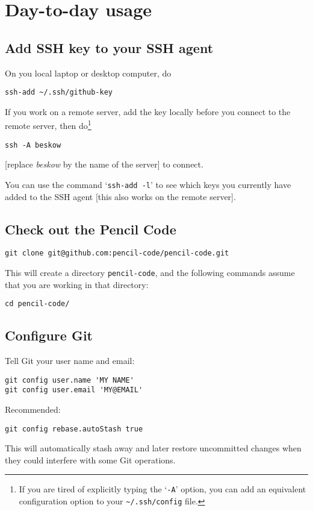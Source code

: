 \documentclass[12pt,pdftex]{article}
\begin{document}
\section{Day-to-day usage}

\subsection{Add SSH key to your SSH agent}

On you local laptop or desktop computer, do
\begin{lstlisting}
ssh-add ~/.ssh/github-key
\end{lstlisting}

If you work on a remote server, add the key locally before you connect
to the remote server, then do\footnote{
  If you are tired of explicitly typing the ‘\texttt{-A}’ option, you can
  add an equivalent configuration option to your
  \texttt{\textasciitilde{}/.ssh/config} file.%
}
\begin{lstlisting}
ssh -A beskow
\end{lstlisting}
[replace \emph{beskow} by the name of the server] to connect.

You can use the command ‘\texttt{ssh-add -l}’ to see which keys you
currently have added to the SSH agent [this also works on the remote
server].


\subsection{Check out the Pencil Code}

\begin{lstlisting}
git clone git@github.com:pencil-code/pencil-code.git
\end{lstlisting}
This will create a directory \texttt{pencil-code}, and the following
commands assume that you are working in that directory:
\begin{lstlisting}
cd pencil-code/
\end{lstlisting}


\subsection{Configure Git}

Tell Git your user name and email:
\begin{lstlisting}
git config user.name 'MY NAME'
git config user.email 'MY@EMAIL'
\end{lstlisting}

Recommended:
\begin{lstlisting}
git config rebase.autoStash true
\end{lstlisting}
This will automatically stash away and later restore uncommitted changes
when they could interfere with some Git operations.
\end{document}
